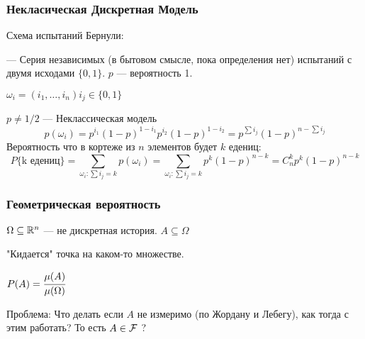 \subsubsection{Некласическая Дискретная Модель}  
Схема испытаний Бернули:

--- Серия независимых (в бытовом смысле, пока определения нет) испытаний с двумя исходами $\{0,1\}$. $p$ --- вероятность 1.

$\omega_i = (i_1, \ldots, i_n) i_j \in \{0, 1\}$

$p \neq 1/2$ --- Неклассическая модель  
$$
p(\omega_i) = p^{i_1}(1-p)^{1-i_1}p^{i_2}(1 - p)^{1-i_2} = p^{\sum i_j} (1-p)^{n - \sum i_j}
$$
Вероятность что в кортеже из $n$ элементов будет $k$ едениц:
$$
P\{\text{k едениц}\} = \sum_{\omega_i: \sum i_j = k} p(\omega_i) = \sum_{\omega_i: \sum i_j = k} p^k (1 - p)^{n-k} = C_n^kp^k(1-p)^{n-k}
$$

\subsubsection{Геометрическая вероятность}  
$\Omega \subseteq \mathbb{R}^n$ --- не дискретная история. $A \subseteq \Omega$

"Кидается" точка на каком-то множестве. 

$P(A) = \cfrac{\mu(A)}{\mu(\Omega)}$  

Проблема: Что делать если $A$ не измеримо (по Жордану и Лебегу), как тогда с этим работать? То есть $A \in \mathcal{F} $ ?
